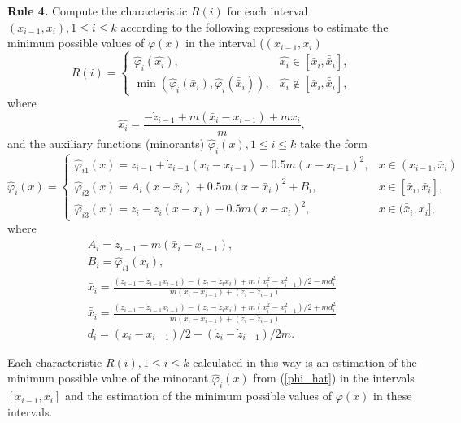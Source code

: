 \documentclass[runningheads]{llncs}
\begin{document}
\textbf{Rule 4.} Compute the characteristic $R(i)$ for each interval $(x_{i-1}, x_i), 1 \le i \le k$ according to the following expressions to estimate the minimum possible values of $\varphi(x)$ in the interval ($(x_{i-1}, x_i)$
\begin{equation}
R(i) = \left\{
\begin{array}{ll}
\widehat{\varphi}_i(\widehat{x_i}), & \widehat{x_i} \in [\bar{x}_i,\bar{\bar{x}}_i], \\
\min (\widehat{\varphi}_i(\bar{x}_i),\widehat{\varphi}_i(\bar{\bar{x}}_i)), & \widehat{x_i} \notin [\bar{x}_i,\bar{\bar{x}}_i],
\end{array}
\right.
\end{equation}
where
\begin{equation}
\widehat{x_i} = \frac{-\dot{z}_{i-1}+m(\bar{x}_i-x_{i-1})+mx_i}{m},
\end{equation}
and the auxiliary functions (minorants) $\widehat{\varphi}_i(x), 1 \le i \le k$ take the form
\begin{equation}\label{phi_hat}
\widehat{\varphi}_i(x) = \left\{
\begin{array}{ll}
\widehat{\varphi}_{i1}(x) = z_{i-1}+\dot{z}_{i-1}(x_i-x_{i-1})-0.5m(x-x_{i-1})^2, & x \in (x_{i-1},\bar{x}_i) \\
\widehat{\varphi}_{i2}(x) = A_i(x-\bar{x}_i)+0.5m(x-\bar{x}_i)^2 +B_i, & x \in [\bar{x}_i, \bar{\bar{x}}_i], \\
\widehat{\varphi}_{i3}(x) = z_i-\dot{z}_i(x-x_i)-0.5m(x-x_i)^2, & x \in (\bar{\bar{x}}_i, x_i],
\end{array}
\right.
\end{equation}
where
\begin{equation}
\begin{array}{lr}
A_i=\dot{z}_{i-1}-m(\bar{x}_i-x_{i-1}), \\
B_i = \widehat{\varphi}_{i1}(\bar{x}_i), \\
\bar{x}_i = \frac{(z_{i-1}-\dot{z}_{i-1}x_{i-1})-(z_i-\dot{z}_ix_i)+m(x_i^2-x_{i-1}^2)/2-md_i^2}{m(x_i-x_{i-1})+(\dot{z}_i-\dot{z}_{i-1})} \\
\bar{\bar{x}}_i = \frac{(z_{i-1}-\dot{z}_{i-1}x_{i-1})-(z_i-\dot{z}_ix_i)+m(x_i^2-x_{i-1}^2)/2+md_i^2}{m(x_i-x_{i-1})+(\dot{z}_i-\dot{z}_{i-1})} \\
d_i = (x_i-x_{i-1})/2-(\dot{z}_i-\dot{z}_{i-1})/2m.
\end{array}
\end{equation}

Each characteristic $R(i), 1 \le i \le k$ calculated in this way is an estimation of the minimum possible value of the minorant $\widehat{\varphi}_i(x)$ from (\ref{phi_hat}) in the intervals $[x_{i-1}, x_i]$ and the estimation of the minimum possible values of $\varphi(x)$ in these intervals.
\end{document}
